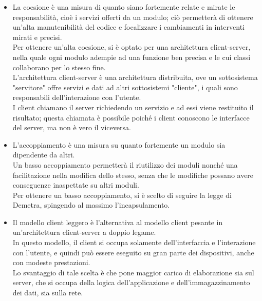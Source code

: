         \begin{itemize}
            \item La coesione è una misura di quanto siano fortemente relate e mirate le responsabilità, cioè i servizi offerti da un modulo; ciò permetterà di ottenere un’alta manutenibilità del codice e focalizzare i cambiamenti in interventi mirati e precisi. \\
            Per ottenere un'alta coesione, si è optato per una architettura client-server, nella quale ogni modulo adempie ad una funzione ben precisa e le cui classi collaborano per lo stesso fine. \\
            L'architettura client-server è una architettura distribuita, ove un sottosistema "servitore" offre servizi e dati ad altri sottosistemi "cliente", i quali sono responsabili dell'interazione con l'utente. \\
            I client chiamano il server richiedendo un servizio e ad essi viene restituito il risultato; questa chiamata è possibile poiché i client conoscono le interfacce del server, ma non è vero il viceversa.
            \item L’accoppiamento è una misura su quanto fortemente un modulo sia dipendente da altri. \\
            Un basso accoppiamento permetterà il riutilizzo dei moduli nonché una facilitazione nella modifica dello stesso, senza che le modifiche possano avere conseguenze inaspettate su altri moduli. \\
            Per ottenere un basso accoppiamento, si è scelto di seguire la legge di Demetra, spingendo al massimo l'incapsulamento.
            \item Il modello client leggero è l'alternativa al modello client pesante in un'architettura client-server a doppio legame. \\
            In questo modello, il client si occupa solamente dell'interfaccia e l'interazione con l'utente, e quindi può essere eseguito su gran parte dei dispositivi, anche con modeste prestazioni. \\
            Lo svantaggio di tale scelta è che pone maggior carico di elaborazione sia sul server, che si occupa della logica dell'applicazione e dell'immagazzinamento dei dati, sia sulla rete.
        \end{itemize}

